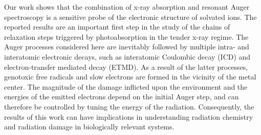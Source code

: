 Our work shows that the combination of x-ray absorption and resonant Auger spectroscopy is a sensitive probe of the electronic structure of solvated ions. The reported results are an important first step in the study of the chains of relaxation steps triggered by photoabsorption in the tender x-ray regime. The Auger processes considered here are inevitably followed by multiple intra- and interatomic electronic decays, such as interatomic Coulombic decay (ICD) and electron-transfer mediated decay (ETMD). As a result of the latter processes, genotoxic free radicals and slow electrons are formed in the vicinity of the metal center. The magnitude of the damage inflicted upon the environment and the energies of the emitted electrons depend on the initial Auger step, and can therefore be controlled by tuning the energy of the radiation. Consequently, the results of this work can have implications in understanding radiation chemistry and radiation damage in biologically relevant systems.